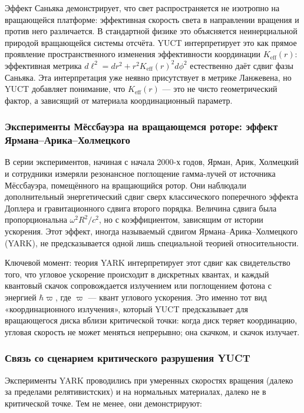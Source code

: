 \documentclass[12pt,a4paper]{article}
\begin{document}
	Эффект Саньяка демонстрирует, что свет распространяется не изотропно на вращающейся платформе: эффективная скорость света в направлении вращения и против него различается. В стандартной физике это объясняется неинерциальной природой вращающейся системы отсчёта. YUCT интерпретирует это как прямое проявление пространственного изменения эффективности координации \(K_{\mathrm{eff}}(r)\): эффективная метрика \(d\ell^2 = dr^2 + r^2 K_{\mathrm{eff}}(r)^2 d\phi^2\) естественно даёт сдвиг фазы Саньяка. Эта интерпретация уже неявно присутствует в метрике Ланжевена, но YUCT добавляет понимание, что \(K_{\mathrm{eff}}(r)\) — это не чисто геометрический фактор, а зависящий от материала координационный параметр.
	
	\subsubsection{Эксперименты Мёссбауэра на вращающемся роторе: эффект Ярмана–Арика–Холмецкого}
	
	В серии экспериментов, начиная с начала 2000-х годов, Ярман, Арик, Холмецкий и сотрудники измеряли резонансное поглощение гамма-лучей от источника Мёссбауэра, помещённого на вращающийся ротор. Они наблюдали дополнительный энергетический сдвиг сверх классического поперечного эффекта Доплера и гравитационного сдвига второго порядка. Величина сдвига была пропорциональна \(\omega^2 R^2 / c^2\), но с коэффициентом, зависящим от истории ускорения. Этот эффект, иногда называемый сдвигом Ярмана–Арика–Холмецкого (YARK), не предсказывается одной лишь специальной теорией относительности.
	
	Ключевой момент: теория YARK интерпретирует этот сдвиг как свидетельство того, что угловое ускорение происходит в дискретных квантах, и каждый квантовый скачок сопровождается излучением или поглощением фотона с энергией \(\hbar \varpi\), где \(\varpi\) — квант углового ускорения. Это именно тот вид «координационного излучения», который YUCT предсказывает для вращающегося диска вблизи критической точки: когда диск теряет координацию, угловая скорость не может меняться непрерывно; она скачком, и скачок излучает.
	
	\subsubsection{Связь со сценарием критического разрушения YUCT}
	
	Эксперименты YARK проводились при умеренных скоростях вращения (далеко за пределами релятивистских) и на нормальных материалах, далеко не в критической точке. Тем не менее, они демонстрируют:
	
\end{document}
